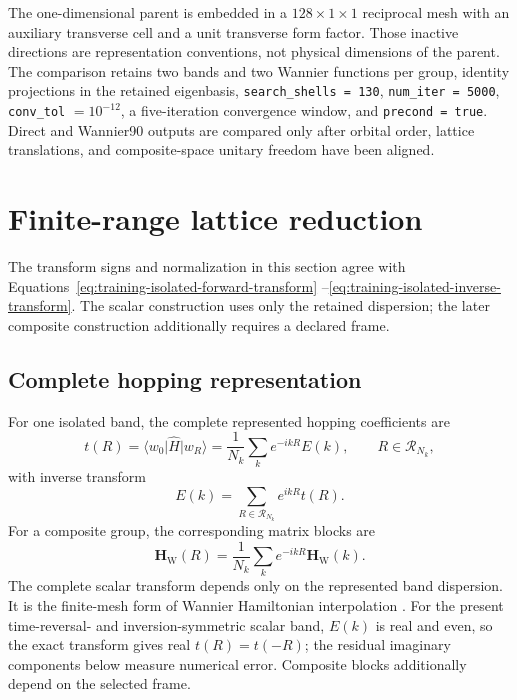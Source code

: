 The one-dimensional parent is embedded in a $128\times1\times1$ reciprocal
mesh with an auxiliary transverse cell and a unit transverse form factor. Those
inactive directions are representation conventions, not physical dimensions
of the parent. The comparison retains two bands and two Wannier functions per group, identity
projections in the retained eigenbasis,
\texttt{search\_shells = 130}, \texttt{num\_iter = 5000},
\texttt{conv\_tol} $=10^{-12}$, a five-iteration convergence window, and
\texttt{precond = true}. Direct and Wannier90 outputs are compared only after
orbital order, lattice translations, and composite-space unitary freedom have
been aligned.

\section{Finite-range lattice reduction}

The transform signs and normalization in this section agree with
Equations~\eqref{eq:training-isolated-forward-transform}
--\eqref{eq:training-isolated-inverse-transform}. The scalar construction uses
only the retained dispersion; the later composite construction additionally
requires a declared frame.

\subsection{Complete hopping representation}

For one isolated band, the complete represented hopping coefficients are
\begin{equation}
    t(R)
    =
    \langle w_0\rvert\hat H\lvert w_R\rangle
    =
    \frac{1}{N_k}\sum_k e^{-ikR}E(k),
    \qquad R\in\mathcal R_{N_k},
    \label{eq:periodic-1d-scalar-hopping}
\end{equation}
with inverse transform
\begin{equation}
    E(k)=\sum_{R\in\mathcal R_{N_k}}e^{ikR}t(R).
\end{equation}
For a composite group, the corresponding matrix blocks are
\begin{equation}
    \mathbf H_{\mathrm W}(R)
    =
    \frac{1}{N_k}\sum_k
    e^{-ikR}\mathbf H_{\mathrm W}(k).
    \label{eq:periodic-1d-block-hopping}
\end{equation}
The complete scalar transform depends only on the represented band dispersion. It is
the finite-mesh form of Wannier Hamiltonian interpolation
\cite{marzari2012,trefethen2000}. For the present time-reversal- and
inversion-symmetric scalar band, $E(k)$ is
real and even, so the exact transform gives real $t(R)=t(-R)$; the residual
imaginary components below measure numerical error. Composite blocks
additionally depend on the selected frame.

